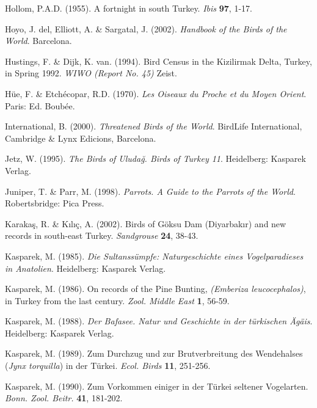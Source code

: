 \documentclass[
  10.5pt,
  a4paper,
  DIV=11,
  numbers=noendperiod,
  twocolumn]{scrreprt}
\newlength{\cslhangindent}
\newenvironment{CSLReferences}[2] %
 {\begin{list}{}{%
  \setlength{\itemindent}{0pt}
  \setlength{\leftmargin}{0pt}
  \setlength{\parsep}{0pt}
  \ifodd #1
   \setlength{\leftmargin}{\cslhangindent}
   \setlength{\itemindent}{-1\cslhangindent}
  \fi
  \setlength{\itemsep}{#2\baselineskip}}}
 {\end{list}}
\begin{document}
\begin{CSLReferences}{1}{1}
Hollom, P.A.D. (1955). {A fortnight in south Turkey}. \emph{Ibis}
\textbf{97}, 1-17.

Hoyo, J. del, Elliott, A. \& Sargatal, J. (2002). \emph{{Handbook of the
Birds of the World}}. Barcelona.

Hustings, F. \& Dijk, K. van. (1994). {Bird Census in the Kizilirmak
Delta, Turkey, in Spring 1992}. \emph{WIWO (Report No. 45)} Zeist.

Hüe, F. \& Etchécopar, R.D. (1970). \emph{{Les Oiseaux du Proche et du
Moyen Orient}}. Paris: Ed. Boubée.

International, B. (2000). \emph{{Threatened Birds of the World}}.
BirdLife International, Cambridge \& Lynx Edicions, Barcelona.

Jetz, W. (1995). \emph{{The Birds of Uludağ. Birds of Turkey 11}}.
Heidelberg: Kasparek Verlag.

Juniper, T. \& Parr, M. (1998). \emph{{Parrots. A Guide to the Parrots
of the World}}. Robertsbridge: Pica Press.

Karakaş, R. \& Kılıç, A. (2002). {Birds of Göksu Dam (Diyarbakır) and
new records in south-east Turkey}. \emph{Sandgrouse} \textbf{24}, 38-43.

Kasparek, M. (1985). \emph{{Die Sultanssümpfe: Naturgeschichte eines
Vogelparadieses in Anatolien}}. Heidelberg: Kasparek Verlag.

Kasparek, M. (1986). {On records of the Pine Bunting, \emph{(Emberiza
leucocephalos)}, in Turkey from the last century}. \emph{Zool. Middle
East} \textbf{1}, 56-59.

Kasparek, M. (1988). \emph{{Der Bafasee. Natur und Geschichte in der
türkischen Ägäis}}. Heidelberg: Kasparek Verlag.

Kasparek, M. (1989). {Zum Durchzug und zur Brutverbreitung des
Wendehalses (\emph{Jynx torquilla}) in der Türkei}. \emph{Ecol. Birds}
\textbf{11}, 251-256.

Kasparek, M. (1990). {Zum Vorkommen einiger in der Türkei seltener
Vogelarten}. \emph{Bonn. Zool. Beitr.} \textbf{41}, 181-202.


\end{CSLReferences}
\end{document}
